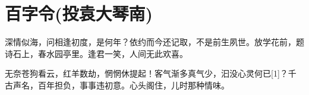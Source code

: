 \section{百字令(投袁大琴南)}


深情似海，问相逢初度，是何年？依约而今还记取，不是前生夙世。放学花前，题诗石上，春水园亭里。逢君一笑，人间无此欢喜。


无奈苍狗看云，红羊数劫，惘惘休提起！客气渐多真气少，汩没心灵何已[1]？千古声名，百年担负，事事违初意。心头阁住，儿时那种情味。
